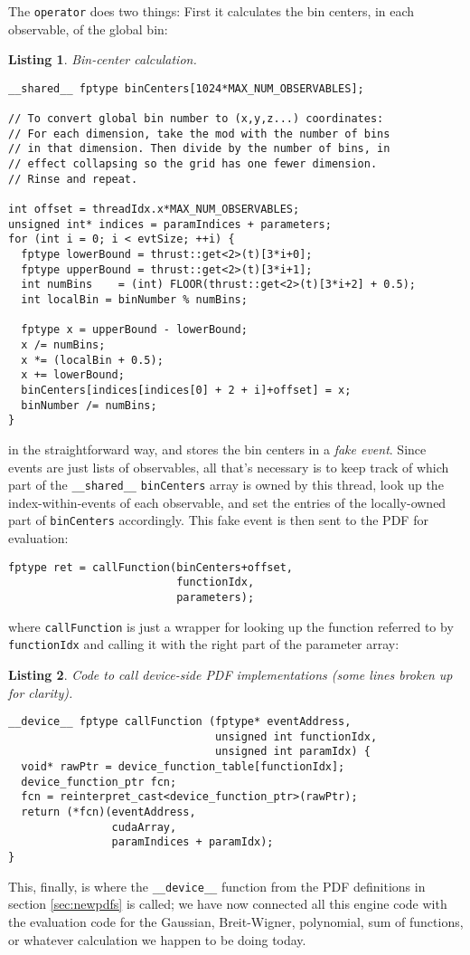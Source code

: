 \documentclass[12pt,pdflatex]{article}
\newtheorem{listing}{Listing}
\begin{document}
The \texttt{operator} does two things: First it calculates the bin centers,
in each observable, of the global bin:
\begin{listing}
\label{listing:bincenter}
Bin-center calculation.

\begin{verbatim}
__shared__ fptype binCenters[1024*MAX_NUM_OBSERVABLES];

// To convert global bin number to (x,y,z...) coordinates: 
// For each dimension, take the mod with the number of bins 
// in that dimension. Then divide by the number of bins, in 
// effect collapsing so the grid has one fewer dimension. 
// Rinse and repeat. 

int offset = threadIdx.x*MAX_NUM_OBSERVABLES;
unsigned int* indices = paramIndices + parameters;
for (int i = 0; i < evtSize; ++i) {
  fptype lowerBound = thrust::get<2>(t)[3*i+0];
  fptype upperBound = thrust::get<2>(t)[3*i+1];
  int numBins    = (int) FLOOR(thrust::get<2>(t)[3*i+2] + 0.5); 
  int localBin = binNumber % numBins;

  fptype x = upperBound - lowerBound; 
  x /= numBins;
  x *= (localBin + 0.5); 
  x += lowerBound;
  binCenters[indices[indices[0] + 2 + i]+offset] = x; 
  binNumber /= numBins;
}
\end{verbatim}
\end{listing}
in the straightforward way, and stores the bin centers in a \emph{fake event}.
Since events are just lists of observables, all that's necessary is to keep track
of which part of the \verb|__shared__| \texttt{binCenters} array is owned by this
thread, look up the index-within-events of each observable, and set the entries
of the locally-owned part of \texttt{binCenters} accordingly. This fake event is then
sent to the PDF for evaluation:
\begin{verbatim}
fptype ret = callFunction(binCenters+offset, 
                          functionIdx, 
                          parameters); 
\end{verbatim}
where \texttt{callFunction} is just a wrapper for looking up the function referred to
by \texttt{functionIdx} and calling it with the right part of the parameter array:
\begin{listing}
\label{listing:callfunction}
Code to call device-side PDF implementations (some lines
broken up for clarity). 

\begin{verbatim}
__device__ fptype callFunction (fptype* eventAddress, 
                                unsigned int functionIdx, 
                                unsigned int paramIdx) {
  void* rawPtr = device_function_table[functionIdx];
  device_function_ptr fcn;
  fcn = reinterpret_cast<device_function_ptr>(rawPtr);
  return (*fcn)(eventAddress, 
                cudaArray, 
                paramIndices + paramIdx);
}
\end{verbatim}
\end{listing}
This, finally, is where the \verb|__device__| function from the PDF definitions
in section \ref{sec:newpdfs} is called; we have now connected all this engine
code with the evaluation code for the Gaussian, Breit-Wigner, polynomial, sum of
functions, or whatever calculation we happen to be doing today. 
\end{document}
